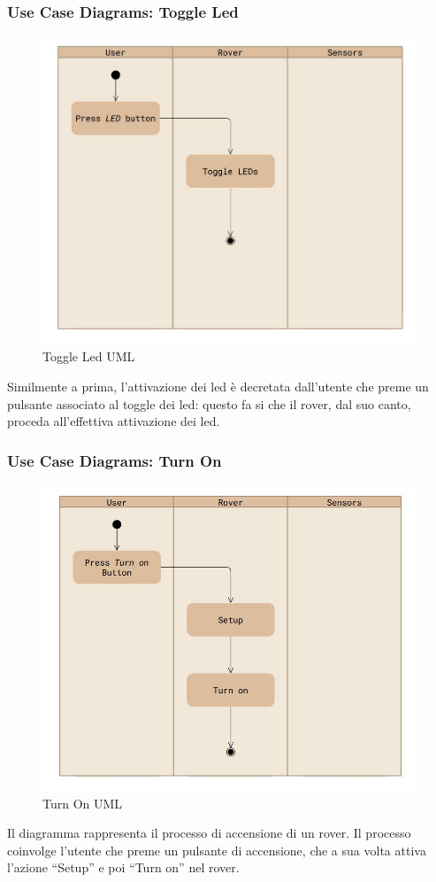 \documentclass{article}
\begin{document}
      \subsubsection{Use Case Diagrams: Toggle Led}
        \begin{figure}[h]
          \includegraphics[width=0.7\linewidth]{../Use_Case_Diagram/Toggle_Led.jpg}
          \centering
          \caption{Toggle Led UML}     
        \end{figure}
        Similmente a prima, l'attivazione dei led è decretata dall'utente che preme un pulsante associato al toggle dei led: questo fa si che il rover, dal suo canto, proceda all'effettiva attivazione dei led. 



      \subsubsection{Use Case Diagrams: Turn On}
        \begin{figure}[h]
          \includegraphics[width=0.7\linewidth]{../Use_Case_Diagram/Turn_on.jpg}
          \centering
          \caption{Turn On UML}
        \end{figure}
        Il diagramma rappresenta il processo di accensione di un rover. Il processo coinvolge l’utente che preme un pulsante di accensione, che a sua volta attiva l’azione “Setup” e poi “Turn on” nel rover. 
\end{document}
